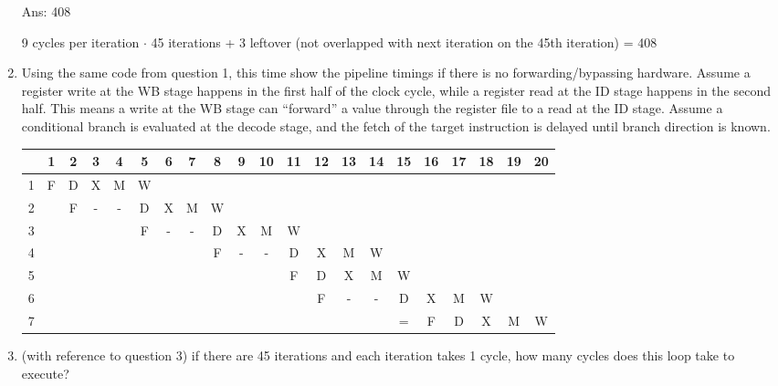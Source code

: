 \documentclass[12pt]{article}
\begin{document}
\begin{enumerate}
        Ans: 408

        9 cycles per iteration $\cdot$ 45 iterations + 3 leftover (not overlapped with next iteration on the 45th iteration) = 408

        \item Using the same code from question 1, this time show the pipeline timings if there is no forwarding/bypassing 
        hardware. Assume a register write at the WB stage happens in the first half of the clock cycle, while a register 
        read at the ID stage happens in the second half. This means a write at the WB stage can ``forward'' a value 
        through the register file to a read at the ID stage. Assume a conditional branch is evaluated at the decode 
        stage, and the fetch of the target instruction is delayed until branch direction is known.

        \begin{tabular}[ht!]{|c|c|c|c|c|c|c|c|c|c|c|c|c|c|c|c|c|c|c|c|c|}\hline
                & 1 & 2 & 3 & 4 & 5 & 6 & 7 & 8 & 9 & 10 & 11 & 12 & 13 & 14 & 15 & 16 & 17 & 18 & 19 & 20 \\\hline
            1   & F & D & X & M & W &   &   &   &   &    &    &    &    &    &    &    &    &    &    &    \\\hline
            2   &   & F & - & - & D & X & M & W &   &    &    &    &    &    &    &    &    &    &    &    \\\hline
            3   &   &   &   &   & F & - & - & D & X & M  & W  &    &    &    &    &    &    &    &    &    \\\hline
            4   &   &   &   &   &   &   &   & F & - & -  & D  & X  & M  & W  &    &    &    &    &    &    \\\hline
            5   &   &   &   &   &   &   &   &   &   &    & F  & D  & X  & M  & W  &    &    &    &    &    \\\hline
            6   &   &   &   &   &   &   &   &   &   &    &    & F  & -  & -  & D  & X  & M  & W  &    &    \\\hline
            7   &   &   &   &   &   &   &   &   &   &    &    &    &    &    & =  & F  & D  & X  & M  & W  \\\hline
        \end{tabular}

        \item (with reference to question 3) if there are 45 iterations and each iteration takes 1 cycle, how many cycles 
        does this loop take to execute?


\end{enumerate}
\end{document}
